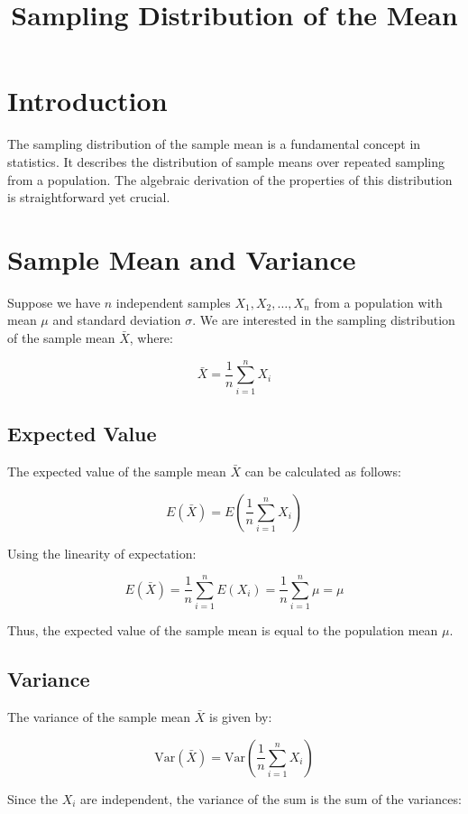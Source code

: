 \documentclass{article}
\begin{document}
\title{Sampling Distribution of the Mean}
\author{}
\date{}
\maketitle

\section{Introduction}
The sampling distribution of the sample mean is a fundamental concept in statistics. It describes the distribution of sample means over repeated sampling from a population. The algebraic derivation of the properties of this distribution is straightforward yet crucial.

\section{Sample Mean and Variance}
Suppose we have \( n \) independent samples \( X_1, X_2, \ldots, X_n \) from a population with mean \( \mu \) and standard deviation \( \sigma \). We are interested in the sampling distribution of the sample mean \(\bar{X}\), where:

\[
\bar{X} = \frac{1}{n} \sum_{i=1}^{n} X_i
\]

\subsection{Expected Value}
The expected value of the sample mean \(\bar{X}\) can be calculated as follows:

\[
E(\bar{X}) = E \left( \frac{1}{n} \sum_{i=1}^{n} X_i \right)
\]

Using the linearity of expectation:

\[
E(\bar{X}) = \frac{1}{n} \sum_{i=1}^{n} E(X_i) = \frac{1}{n} \sum_{i=1}^{n} \mu = \mu
\]

Thus, the expected value of the sample mean is equal to the population mean \( \mu \).

\subsection{Variance}
The variance of the sample mean \(\bar{X}\) is given by:

\[
\text{Var}(\bar{X}) = \text{Var} \left( \frac{1}{n} \sum_{i=1}^{n} X_i \right)
\]

Since the \(X_i\) are independent, the variance of the sum is the sum of the variances:
\end{document}
